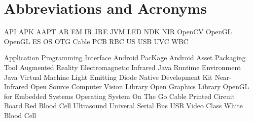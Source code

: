 \chapter{Abbreviations and Acronyms}\label{chapter:abbreviations}

\begin{multicols}{2}
\setlength{\parindent}{0pt}

	API
	\hfill \break
	APK
	\hfill \break
	AAPT
	\hfill \break
	AR
	\hfill \break 
	EM
	\hfill \break 
	IR
	\hfill \break 
	JRE
	\hfill \break
	JVM
	\hfill \break
	LED
	\hfill \break 
	NDK
	\hfill \break
	NIR
	\hfill \break 
	OpenCV
	\hfill \break
	OpenGL
	\hfill \break
	OpenGL ES
	\hfill \break
	OS
	\hfill \break
	OTG Cable
	\hfill \break 
	PCB	
	\hfill \break
	RBC
	\hfill \break 
	US
	\hfill \break 
	USB
	\hfill \break
	UVC	
	\hfill \break 
	WBC



	
\columnbreak
 
	Application Programming Interface
	\hfill \break
	Android PacKage 
	\hfill \break
	Android Asset Packaging Tool
	\hfill \break
	Augmented Reality
	\hfill \break 
	Electromagnetic
	\hfill \break 
	Infrared
	\hfill \break
	Java Runtime Environment
	\hfill \break
	Java Virtual Machine
	\hfill \break 
	Light Emitting Diode
 	\hfill \break
	Native Development Kit 
	\hfill \break
	Near-Infrared
	\hfill \break
	Open Source Computer Vision Library
	\hfill \break
	Open Graphics Library
	\hfill \break
	OpenGL for Embedded Systems
	\hfill \break
	Operating System
 	\hfill \break
	On The Go Cable
	\hfill \break
	Printed Circuit Board
	\hfill \break
	Red Blood Cell 
	\hfill \break
	Ultrasound
	\hfill \break 
	Univeral Serial Bus
	\hfill \break 
	USB Video Class
	\hfill \break
	White Blood Cell 

\end{multicols}